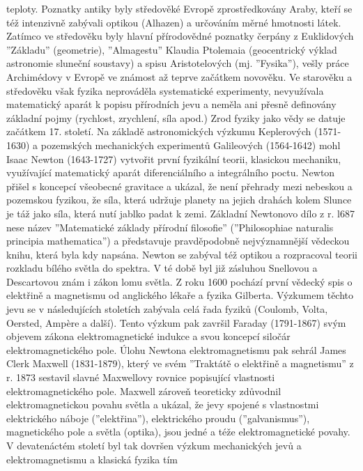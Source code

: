 {    teploty. Poznatky antiky byly středověké Evropě zprostředkovány Araby, kteří se též intenzivně 
    zabývali optikou (Alhazen) a určováním měrné hmotnosti látek. Zatímco ve středověku byly hlavní 
    přírodovědné poznatky čerpány z Euklidových ”Základu” (geometrie), ”Almagestu” Klaudia 
    Ptolemaia (geocentrický výklad astronomie sluneční soustavy) a spisu Aristotelových (mj. 
    ”Fysika”), vešly práce Archimédovy v Evropě ve známost až teprve začátkem novověku. Ve 
    starověku a středověku však fyzika neprováděla systematické experimenty, nevyužívala 
    matematický aparát k popisu přírodních jevu a neměla ani přesně definovány základní pojmy 
    (rychlost, zrychlení, síla apod.) Zrod fyziky jako vědy se datuje začátkem 17. století. Na 
    základě astronomických výzkumu Keplerových (1571-1630) a pozemských mechanických experimentů 
    Galileových (1564-1642) mohl Isaac Newton (1643-1727) vytvořit první fyzikální teorii, 
    klasickou mechaniku, využívající matematický aparát diferenciálního a integrálního poctu. 
    Newton přišel s koncepcí všeobecné gravitace a ukázal, že není přehrady mezi nebeskou a 
    pozemskou fyzikou, že síla, která udržuje planety na jejich drahách kolem Slunce je táž jako 
    síla, která nutí jablko padat k zemi. Základní Newtonovo dílo z r. l687 nese název ”Matematické 
    základy přírodní filosofie” (”Philosophiae naturalis principia mathematica”) a představuje 
    pravděpodobně nejvýznamnější vědeckou knihu, která byla kdy napsána. Newton se zabýval též 
    optikou a rozpracoval teorii rozkladu bílého světla do spektra. V té době byl již zásluhou 
    Snellovou a Descartovou znám i zákon lomu světla. Z roku 1600 pochází první vědecký spis o 
    elektřině a magnetismu od anglického lékaře a fyzika Gilberta. Výzkumem  těchto jevu se v 
    následujících stoletích zabývala celá řada fyziků (Coulomb, Volta, Oersted, Amp\`{e}re a 
    další). Tento výzkum pak završil Faraday (1791-1867) svým objevem zákona elektromagnetické 
    indukce a svou koncepcí siločár elektromagnetického pole. Úlohu Newtona elektromagnetismu pak 
    sehrál James Clerk Maxwell (1831-1879), který ve svém ”Traktátě o elektřině a magnetismu” z r. 
    1873 sestavil slavné Maxwellovy rovnice popisující vlastnosti elektromagnetického pole. Maxwell 
    zároveň teoreticky zdůvodnil elektromagnetickou povahu světla a ukázal, že jevy spojené 
    s vlastnostmi elektrického náboje (”elektřina”), elektrického proudu (”galvanismus”), 
    magnetického pole a světla (optika), jsou jedné a téže elektromagnetické povahy. V devatenáctém 
    století byl tak dovršen výzkum mechanických jevů a elektromagnetismu a klasická fyzika tím 
}
